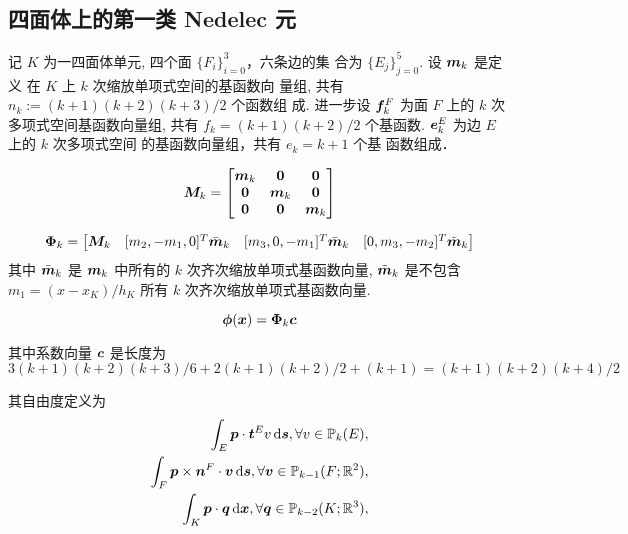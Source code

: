 \documentclass{article}
\begin{document}
\subsection{四面体上的第一类 Nedelec 元}
记 $K$ 为一四面体单元, 四个面 $\{F_i\}_{i=0}^3$，六条边的集 合为
$\{E_j\}_{j=0}^{5}$. 设 ${\boldsymbol m}_k$ 是定义 在 $K$ 上 $k$ 次缩放单项式空间的基函数向
量组, 共有 $n_k:=(k+1)(k+2)(k+3)/2$ 个函数组 成. 进一步设 ${\boldsymbol f}_{k}^F$ 为面 $F$
上的 $k$ 次多项式空间基函数向量组, 共有 $f_k = (k+1)(k+2)/2$ 个基函数.
${\boldsymbol e}_{k}^E$ 为边 $E$ 上的 $k$ 次多项式空间 的基函数向量组，共有 $e_k=k+1$ 个基
函数组成．

$$
{\boldsymbol M}_k = 
    \begin{bmatrix}
        {\boldsymbol m}_{k} & \mathbf 0 & \mathbf 0 \\ 
        \mathbf 0 & {\boldsymbol m}_{k} & \mathbf 0 \\
        \mathbf 0 & \mathbf 0 & {\boldsymbol m}_{k}
    \end{bmatrix} 
$$

$$
{\bm \Phi}_k = 
    \begin{bmatrix}
        {\boldsymbol M}_k & [m_2, -m_1, 0]^T \bar{{\boldsymbol m}}_k & 
       [m_3, 0, -m_1]^T \bar{{\boldsymbol m}}_k  &
       [0, m_3, -m_2]^T \tilde {{\boldsymbol m}}_k \\ 
    \end{bmatrix} 
$$
其中 $\bar{{\boldsymbol m}}_k$ 是 ${\boldsymbol m}_k$ 中所有的 $k$ 次齐次缩放单项式基函数向量, $\tilde
{{\boldsymbol m}}_k$ 是不包含 $m_1 = (x - x_K)/h_K$ 所有 $k$ 次齐次缩放单项式基函数向量.


\begin{equation}
    {\bm \phi}({\boldsymbol x}) = {\bm \Phi}_{k}{\boldsymbol c} 
\end{equation}

其中系数向量 ${\boldsymbol c}$ 是长度为
$$
3(k+1)(k+2)(k+3)/6 + 2(k+1)(k+2)/2 + (k+1) = (k+1)(k+2)(k+4)/2
$$

其自由度定义为
\begin{align*}
    \int_{E}{\boldsymbol p}\cdot{\boldsymbol t}^{E}v\,\mathrm d{\boldsymbol s}, \forall v \in {\mathbb P}_k(E),\\
    \int_{F}{\boldsymbol p}\times{\boldsymbol n}^{F}\cdot {\boldsymbol v}\,\mathrm d{\boldsymbol s}, \forall {\boldsymbol v} \in {\mathbb P}_{k-1}(F;{\mathbb R}^2),\\
    \int_{K}{\boldsymbol p}\cdot{\boldsymbol q}\,\mathrm d{\boldsymbol x}, \forall {\boldsymbol q} \in {\mathbb P}_{k-2}(K;{\mathbb R}^3),\\
\end{align*}
\end{document}
